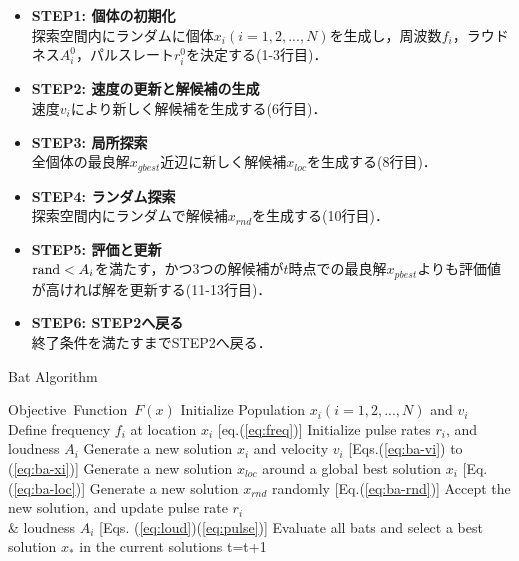 \documentclass[a4j,11pt]{jarticle}
\begin{document}
\begin{itemize}
\item {\bf STEP1: 個体の初期化}\\
探索空間内にランダムに個体$x_i (i=1,2,...,N)$を生成し，周波数$f_i$，ラウドネス$A_i^0$，パルスレート$r_i^0$を決定する(1-3行目)．
\item {\bf STEP2: 速度の更新と解候補の生成}\\
速度$v_i$により新しく解候補を生成する(6行目)．
\item {\bf STEP3: 局所探索}\\
全個体の最良解$x_{gbest}$近辺に新しく解候補$x_{loc}$を生成する(8行目)．
\item {\bf STEP4: ランダム探索}\\
探索空間内にランダムで解候補$x_{rnd}$を生成する(10行目)．
\item {\bf STEP5: 評価と更新}\\
${\rm rand} < A_i$を満たす，かつ3つの解候補が$t$時点での最良解$x_{pbest}$よりも評価値が高ければ解を更新する(11-13行目)．
\item {\bf STEP6: STEP2へ戻る}\\
終了条件を満たすまでSTEP2へ戻る．
\end{itemize}

\begin{algorithm}[H]
\caption{Bat Algorithm}
\label{code:ba}
\begin{algorithmic}[1]
\REQUIRE Objective\ Function\ $F(x)$
\STATE Initialize Population $x_i(i=1,2,..., N)$ and $v_i$\\
\STATE Define frequency $f_i$ at location $x_i$ [eq.(\ref{eq:freq})]
\STATE Initialize pulse rates $r_i$, and loudness $A_i$
\STATE Generate a new solution $x_i$ and velocity $v_i$ [Eqs.(\ref{eq:ba-vi}) to (\ref{eq:ba-xi})]
\STATE Generate a new solution $x_{loc}$ around a global best solution $x_i$ [Eq.(\ref{eq:ba-loc})] 
\ENDIF
\STATE Generate a new solution $x_{rnd}$ randomly [Eq.(\ref{eq:ba-rnd})]
\STATE Accept the new solution, and update pulse rate $r_i$ \\ \& loudness $A_i$ [Eqs. (\ref{eq:loud})(\ref{eq:pulse})]  
\ENDIF
\STATE Evaluate all bats and select a best solution $x_*$ in the current solutions
\ENDFOR
\STATE t=t+1
\ENDWHILE
\end{algorithmic}
\end{algorithm}
\end{document}
